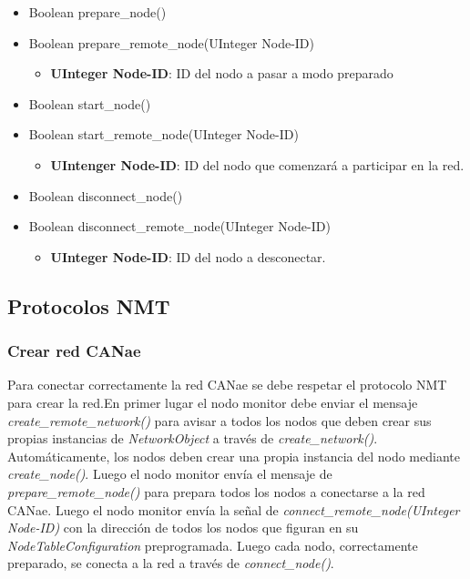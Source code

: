 \begin{itemize}
\item Boolean prepare\_node()
\item Boolean prepare\_remote\_node(UInteger Node-ID)
  \begin{itemize}
   \item \textbf{UInteger Node-ID}: ID del nodo a pasar a modo preparado
  \end{itemize}
\item Boolean start\_node()
\item Boolean start\_remote\_node(UInteger Node-ID)
  \begin{itemize}
    \item \textbf{UIntenger Node-ID}: ID del nodo que comenzará a participar en la red.
   \end{itemize}
\item Boolean disconnect\_node()
\item Boolean disconnect\_remote\_node(UInteger Node-ID)
  \begin{itemize}
    \item \textbf{UInteger Node-ID}: ID del nodo a desconectar.
  \end{itemize}
\end{itemize}

\subsection{Protocolos NMT}
\subsubsection{Crear red CANae}
Para conectar correctamente la red CANae se debe respetar el protocolo NMT para
crear la red.En primer lugar el nodo monitor debe enviar el mensaje
\textit{create\_remote\_network()} para avisar a todos los nodos que deben crear
sus propias instancias de \textit{NetworkObject} a través de
\textit{create\_network()}. Automáticamente, los nodos deben crear una propia
instancia del nodo mediante \textit{create\_node()}. Luego el nodo monitor
envía el mensaje de \textit{prepare\_remote\_node()} para prepara todos los
nodos a conectarse a la red CANae. Luego el nodo monitor envía la señal de
\textit{connect\_remote\_node(UInteger Node-ID)} con la dirección de todos los
nodos que figuran en su \textit{NodeTableConfiguration} preprogramada.
Luego cada nodo, correctamente preparado, se conecta a la red a través de
\textit{connect\_node()}.

